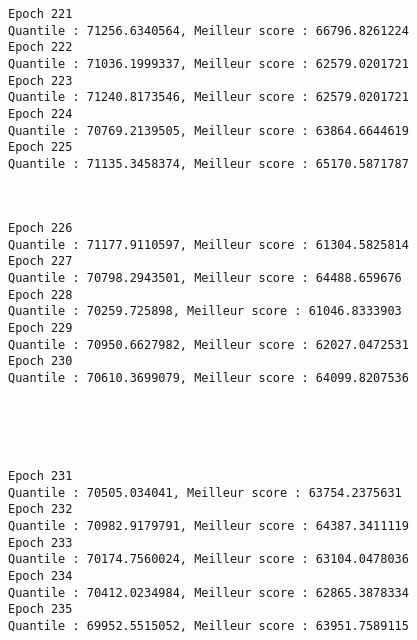 \documentclass[11pt]{article}
\begin{document}
    \begin{Verbatim}[commandchars=\\\{\}]
Epoch 221
Quantile : 71256.6340564, Meilleur score : 66796.8261224
Epoch 222
Quantile : 71036.1999337, Meilleur score : 62579.0201721
Epoch 223
Quantile : 71240.8173546, Meilleur score : 62579.0201721
Epoch 224
Quantile : 70769.2139505, Meilleur score : 63864.6644619
Epoch 225
Quantile : 71135.3458374, Meilleur score : 65170.5871787

    \end{Verbatim}

    \begin{center}
    \end{center}
    { \hspace*{\fill} \\}
    
    \begin{Verbatim}[commandchars=\\\{\}]
Epoch 226
Quantile : 71177.9110597, Meilleur score : 61304.5825814
Epoch 227
Quantile : 70798.2943501, Meilleur score : 64488.659676
Epoch 228
Quantile : 70259.725898, Meilleur score : 61046.8333903
Epoch 229
Quantile : 70950.6627982, Meilleur score : 62027.0472531
Epoch 230
Quantile : 70610.3699079, Meilleur score : 64099.8207536

    \end{Verbatim}

    \begin{center}
    \end{center}
    { \hspace*{\fill} \\}
    
    \begin{center}
    \end{center}
    { \hspace*{\fill} \\}
    
    \begin{Verbatim}[commandchars=\\\{\}]
Epoch 231
Quantile : 70505.034041, Meilleur score : 63754.2375631
Epoch 232
Quantile : 70982.9179791, Meilleur score : 64387.3411119
Epoch 233
Quantile : 70174.7560024, Meilleur score : 63104.0478036
Epoch 234
Quantile : 70412.0234984, Meilleur score : 62865.3878334
Epoch 235
Quantile : 69952.5515052, Meilleur score : 63951.7589115

    \end{Verbatim}
\end{document}
